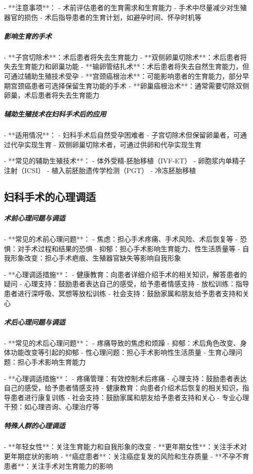 \begin{enumerate}
- **注意事项**：
  - 术前评估患者的生育需求和生育能力
  - 手术中尽量减少对生殖器官的损伤
  - 术后指导患者的生育计划，如避孕时间、怀孕时机等

\subparagraph{影响生育的手术}

- **子宫切除术**：术后患者将失去生育能力
- **双侧卵巢切除术**：术后患者将失去生育能力和卵巢功能
- **输卵管结扎术**：术后患者将失去自然生育能力，但可通过辅助生殖技术受孕
- **宫颈癌根治术**：可能影响患者的生育能力，部分早期宫颈癌患者可选择保留生育功能的手术
- **卵巢癌根治术**：通常需要切除双侧卵巢，术后患者将失去生育能力

\subparagraph{辅助生殖技术在妇科手术后的应用}

- **适用情况**：
  - 妇科手术后自然受孕困难者
  - 子宫切除术但保留卵巢者，可通过代孕实现生育
  - 双侧卵巢切除术者，可通过供卵和代孕实现生育

- **常见的辅助生殖技术**：
  - 体外受精-胚胎移植（IVF-ET）
  - 卵胞浆内单精子注射（ICSI）
  - 植入前胚胎遗传学检测（PGT）
  - 冷冻胚胎移植

\subsection{妇科手术的心理调适}

\subparagraph{术前心理问题与调适}

- **常见的术前心理问题**：
  - 焦虑：担心手术疼痛、手术风险、术后恢复等
  - 恐惧：对手术过程和结果的恐惧
  - 抑郁：担心手术影响生育能力、性生活质量等
  - 自我形象改变：担心手术疤痕、生殖器官缺失等影响自我形象

- **心理调适措施**：
  - 健康教育：向患者详细介绍手术的相关知识，解答患者的疑问
  - 心理支持：鼓励患者表达自己的感受，给予患者情感支持
  - 放松训练：指导患者进行深呼吸、冥想等放松训练
  - 社会支持：鼓励家属和朋友给予患者支持和关心

\subparagraph{术后心理问题与调适}

- **常见的术后心理问题**：
  - 疼痛导致的焦虑和烦躁
  - 抑郁：术后角色改变、身体功能改变等引起的抑郁
  - 性心理问题：担心手术影响性生活质量
  - 生育心理问题：担心手术影响生育能力

- **心理调适措施**：
  - 疼痛管理：有效控制术后疼痛
  - 心理支持：鼓励患者表达自己的感受，给予患者情感支持
  - 健康教育：向患者介绍术后恢复的相关知识，指导患者进行康复训练
  - 社会支持：鼓励家属和朋友给予患者支持和关心
  - 专业心理干预：如心理咨询、心理治疗等

\subparagraph{特殊人群的心理调适}

- **年轻女性**：关注生育能力和自我形象的改变
- **更年期女性**：关注手术对更年期症状的影响
- **癌症患者**：关注癌症复发的风险和生存质量
- **不孕不育患者**：关注手术对生育能力的影响


\end{enumerate}
